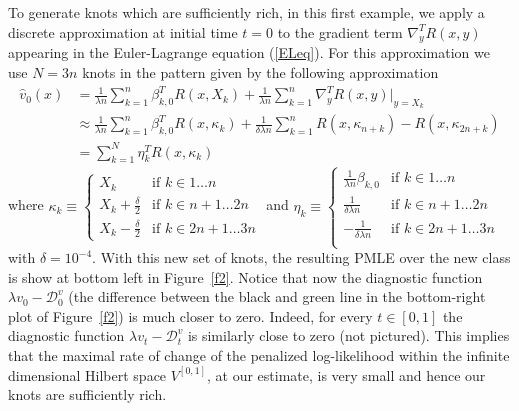 \documentclass[noinfoline]{imsart}
\begin{document}
To generate  knots which are sufficiently rich, in this first example,  we apply a discrete approximation at initial time $t=0$ to the gradient term $ \nabla_{y}^T R(x,y) $ appearing in  the Euler-Lagrange equation (\ref{ELeq}).
 For this approximation we use $N=3n$ knots in the pattern given by the following approximation
\begin{align}
 \hat v_0(x)&=  \frac{1}{\lambda n}\sum_{k=1}^n \beta^T_{k,0} R(x,X_{k})  +  \frac{1}{\lambda n}\sum_{k=1}^n   \nabla^T_{y} R(x,y)\Bigr|_{y= X_{k}} \\
 & \approx \frac{1}{\lambda n}\sum_{k=1}^n \beta^T_{k,0} R(x,\kappa_{k})  +  \frac{1}{\delta \lambda n}\sum_{k=1}^n   R(x,\kappa_{n+k})-R(x,\kappa_{2n+k}) \\
 & = \sum_{k=1}^N \eta^T_{k} R(x,\kappa_{k}) \label{eq:etakappa}
\end{align}
where
$\kappa_{k}\equiv\begin{cases}
X_{k} & \text{if $k \in 1 \dots n$} \\
X_{k}+\frac{\delta}{2} & \text{if $k \in n+1 \dots 2n$} \\
X_{k}-\frac{\delta}{2} & \text{if $k \in 2n+1\dots 3n$}
\end{cases}$ and $\eta_{k}\equiv\begin{cases}
\frac{1}{\lambda n} \beta_{k,0} & \text{if $k \in 1 \dots n$} \\
\frac{1}{\delta \lambda n} & \text{if $k \in n+1 \dots 2n$} \\
-\frac{1}{\delta \lambda n} & \text{if $k \in 2n+1 \dots 3n$} \\
\end{cases}$
with $\delta=10^{-4}$.
 With this new set of knots, the resulting PMLE over the new class is show at bottom left in Figure~\ref{f2}. Notice that now the diagnostic function $\lambda v_0 -\mathcal D_0^v$ (the difference between the black and green line in the bottom-right plot of Figure~\ref{f2}) is much closer to zero. Indeed, for every $t\in [0,1]$ the diagnostic function $\lambda v_t -\mathcal D_t^v$ is similarly close to zero (not pictured). This implies that the maximal rate of change  of the penalized log-likelihood within the infinite dimensional Hilbert space $V^{[0,1]}$, at our estimate, is very small and hence our knots are sufficiently rich.
\end{document}
